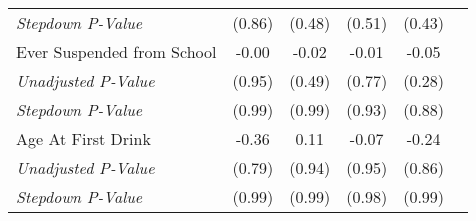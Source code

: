\begin{tabular}{l c c c c c}
\quad \textit{Stepdown P-Value} & (0.86) & (0.48) & (0.51) & (0.43) \\
Ever Suspended from School & -0.00 & -0.02 & -0.01 & -0.05 \\
\quad \textit{Unadjusted P-Value} & (0.95) & (0.49) & (0.77) & (0.28) \\
\quad \textit{Stepdown P-Value} & (0.99) & (0.99) & (0.93) & (0.88) \\
Age At First Drink & -0.36 & 0.11 & -0.07 & -0.24 \\
\quad \textit{Unadjusted P-Value} & (0.79) & (0.94) & (0.95) & (0.86) \\
\quad \textit{Stepdown P-Value} & (0.99) & (0.99) & (0.98) & (0.99) \\
\bottomrule
\end{tabular}
